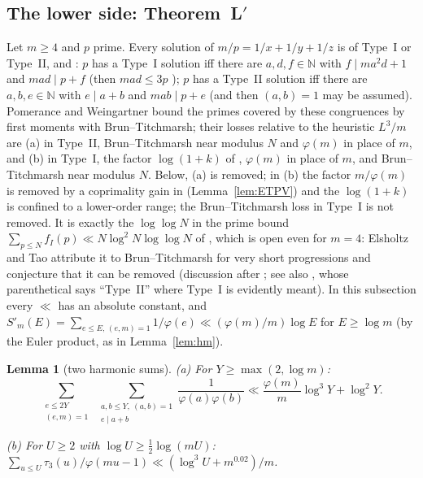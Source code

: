 \documentclass[10pt,reqno]{amsart}
\newtheorem{lemma}[theorem]{Lemma}
\theoremstyle{definition}
\newcommand{\e}{\mathrm e}
\begin{document}
\subsection{\texorpdfstring{The lower side: Theorem~L$'$}{The lower side: Theorem L'}}\label{sec:lower}
Let $m\geq4$ and $p$ prime.  Every solution of $m/p=1/x+1/y+1/z$ is of
Type~I or Type~II, and \cite[Cor.~2.2, Cor.~2.4]{PW}: $p$ has a Type~I
solution iff there are $a,d,f\in\mathbb N$ with $f\mid ma^2d+1$ and
$mad\mid p+f$ (then $mad\leq3p$ \cite[Lemma~7.4]{PW}); $p$ has a
Type~II solution iff there are $a,b,e\in\mathbb N$ with $e\mid a+b$ and
$mab\mid p+e$ (and then $(a,b)=1$ may be assumed).  Pomerance and
Weingartner bound the primes covered by these congruences by first
moments with Brun--Titchmarsh; their losses relative to the heuristic
$L^3/m$ are (a) in Type~II, Brun--Titchmarsh near modulus $N$ and
$\varphi(m)$ in place of $m$, and (b) in Type~I, the factor $\log(1+k)$
of \cite[Prop.~1.4]{ET}, $\varphi(m)$ in place of $m$, and
Brun--Titchmarsh near modulus $N$.  Below, (a) is removed; in (b) the
factor $m/\varphi(m)$ is removed by a coprimality gain in
\cite[Prop.~1.4]{ET} (Lemma~\ref{lem:ETPV}) and the $\log(1+k)$ is
confined to a lower-order range; the Brun--Titchmarsh loss in Type~I is
not removed.  It is
exactly the $\log\log N$ in the prime bound
$\sum_{p\leq N}f_I(p)\ll N\log^2N\log\log N$ of \cite[Thm.~1.1]{ET}, which
is open even for $m=4$: Elsholtz and Tao attribute it to Brun--Titchmarsh
for very short progressions and conjecture that it can be removed
(discussion after \cite[Thm.~1.1]{ET}; see also \cite[\S9]{ET}, whose
parenthetical says ``Type~II'' where Type~I is evidently meant).  %
In this subsection every $\ll$
has an absolute constant, and
$S'_m(E)=\sum_{e\leq E,\,(e,m)=1}1/\varphi(e)\ll(\varphi(m)/m)\log E$
for $E\geq\log m$ (by the Euler product, as in Lemma~\ref{lem:hm}).

\begin{lemma}[two harmonic sums]\label{lem:harm2}
\textup{(a)} For $Y\geq\max(2,\log m)$: %
\[
 \sum_{\substack{e\leq 2Y\\(e,m)=1}}\ \sum_{\substack{a,b\leq Y,\ (a,b)=1\\e\mid a+b}}
 \frac1{\varphi(a)\varphi(b)}\ll\frac{\varphi(m)}m\log^3Y+\log^2Y.
\]

\textup{(b)} For $U\geq2$ with $\log U\geq\frac12\log(mU)$:
$\sum_{u\leq U}\tau_3(u)/\varphi(mu-1)\ll(\log^3U+m^{0.02})/m$.
\end{lemma}
\end{document}
